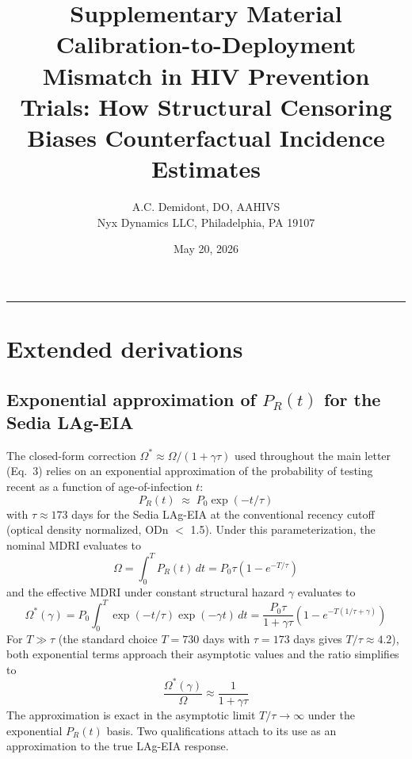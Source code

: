 \documentclass[11pt]{article}
\title{\textbf{Supplementary Material}\\[0.4em]
\large Calibration-to-Deployment Mismatch in HIV Prevention Trials: How Structural Censoring Biases Counterfactual Incidence Estimates}
\author{A.C. Demidont, DO, AAHIVS\\ Nyx Dynamics LLC, Philadelphia, PA 19107}
\date{May 20, 2026}
\begin{document}
\maketitle
\onehalfspacing

\tableofcontents
\vspace{1em}
\hrule
\vspace{1em}
\section{Extended derivations}

\subsection{Exponential approximation of \texorpdfstring{$P_R(t)$}{PR(t)} for the Sedia LAg-EIA}

The closed-form correction $\Omega^* \approx \Omega/(1+\gamma\tau)$ used throughout the main letter (Eq.~3) relies on an exponential approximation of the probability of testing recent as a function of age-of-infection $t$:
\begin{equation}
P_R(t) \;\approx\; P_0 \exp(-t/\tau) \label{eq:PR_exp}
\end{equation}
with $\tau \approx 173$ days for the Sedia LAg-EIA at the conventional recency cutoff (optical density normalized, ODn $<$ 1.5). Under this parameterization, the nominal MDRI evaluates to
\begin{equation}
\Omega = \int_0^T P_R(t)\,dt = P_0 \tau (1 - e^{-T/\tau}) \label{eq:Omega_full}
\end{equation}
and the effective MDRI under constant structural hazard $\gamma$ evaluates to
\begin{equation}
\Omega^*(\gamma) = P_0 \int_0^T \exp(-t/\tau) \exp(-\gamma t)\,dt
= \frac{P_0\tau}{1 + \gamma\tau}\left(1 - e^{-T(1/\tau + \gamma)}\right) \label{eq:Omega_star_full}
\end{equation}
For $T \gg \tau$ (the standard choice $T = 730$ days with $\tau = 173$ days gives $T/\tau \approx 4.2$), both exponential terms approach their asymptotic values and the ratio simplifies to
\begin{equation}
\frac{\Omega^*(\gamma)}{\Omega} \approx \frac{1}{1 + \gamma\tau} \label{eq:Omega_star_closed}
\end{equation}
The approximation is exact in the asymptotic limit $T/\tau \to \infty$ under the exponential $P_R(t)$ basis. Two qualifications attach to its use as an approximation to the true LAg-EIA response.
\end{document}
